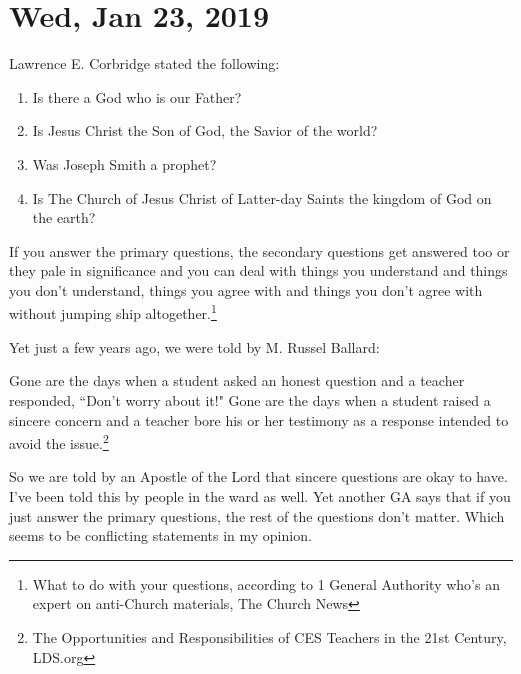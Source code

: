 \section{Wed, Jan 23, 2019}

Lawrence E. Corbridge stated the following:

\begin{displayquote}
\begin{enumerate}
\item Is there a God who is our Father?
\item Is Jesus Christ the Son of God, the Savior of the world?
\item Was Joseph Smith a prophet?
\item Is The Church of Jesus Christ of Latter-day Saints the kingdom of God on the 
earth?
\end{enumerate}

If you answer the primary questions, the secondary questions get answered too or they 
pale in significance and you can deal with things you understand and things you don’t 
understand, things you agree with and things you don’t agree with without jumping 
ship altogether.\footnote{What to do with your questions, according to 1 General 
Authority who's an expert on anti-Church materials, The Church News}
\end{displayquote}

Yet just a few years ago, we were told by M. Russel Ballard:

\begin{displayquote}

Gone are the days when a student asked an honest question and a teacher responded, 
``Don’t worry about it!" Gone are the days when a student raised a sincere concern 
and a teacher bore his or her testimony as a response intended to avoid the 
issue.\footnote{The Opportunities and Responsibilities of CES Teachers in the 21st 
Century, LDS.org}
\end{displayquote}

So we are told by an Apostle of the Lord that sincere questions are okay to have.
I've been told this by people in the ward as well. Yet another GA says that if you
just answer the primary questions, the rest of the questions don't matter. Which
seems to be conflicting statements in my opinion.